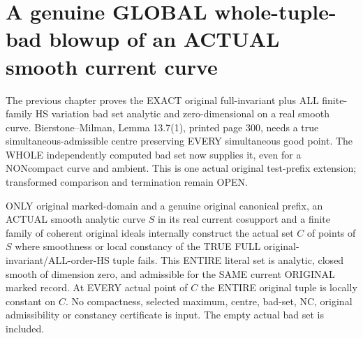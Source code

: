 \section{A genuine GLOBAL whole-tuple-bad blowup of an ACTUAL smooth current curve}

The previous chapter proves the EXACT original full-invariant plus ALL
finite-family HS variation bad set analytic and zero-dimensional on a real
smooth curve. Bierstone--Milman\cite{bierstone-milman97-invent-math},
Lemma 13.7(1), printed page 300, needs a true simultaneous-admissible
centre preserving EVERY simultaneous good point. The WHOLE independently
computed bad set now supplies it, even for a NONcompact curve and ambient.
This is one actual original test-prefix extension; transformed comparison
and termination remain OPEN.

\begin{theorem}
\label{hir:original-smooth-curve-entire-full-tuple-bad-admissible-centre}
\leanok
ONLY original marked-domain and a genuine original canonical prefix, an
ACTUAL smooth analytic curve $S$ in its real current cosupport and a finite
family of coherent original ideals internally construct the actual set
$C$ of points of $S$ where smoothness or local constancy of the TRUE FULL
original-invariant/ALL-order-HS tuple fails. This ENTIRE literal set is
analytic, closed smooth of dimension zero, and admissible for the SAME
current ORIGINAL marked record. At EVERY actual point of $C$ the ENTIRE
original tuple is locally constant on $C$. No compactness, selected maximum,
centre, bad-set, NC, original admissibility or constancy certificate is input.
The empty actual bad set is included.
\end{theorem}
